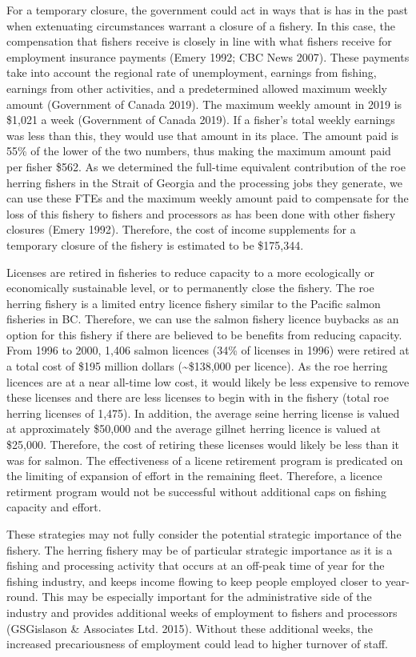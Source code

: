 \documentclass[]{article}
\theoremstyle{definition}
\theoremstyle{definition}
\theoremstyle{definition}
\theoremstyle{remark}
\begin{document}
For a temporary closure, the government could act in ways that is has in
the past when extenuating circumstances warrant a closure of a fishery.
In this case, the compensation that fishers receive is closely in line
with what fishers receive for employment insurance payments (Emery 1992;
CBC News 2007). These payments take into account the regional rate of
unemployment, earnings from fishing, earnings from other activities, and
a predetermined allowed maximum weekly amount (Government of Canada
2019). The maximum weekly amount in 2019 is \$1,021 a week (Government
of Canada 2019). If a fisher's total weekly earnings was less than this,
they would use that amount in its place. The amount paid is 55\% of the
lower of the two numbers, thus making the maximum amount paid per fisher
\$562. As we determined the full-time equivalent contribution of the roe
herring fishers in the Strait of Georgia and the processing jobs they
generate, we can use these FTEs and the maximum weekly amount paid to
compensate for the loss of this fishery to fishers and processors as has
been done with other fishery closures (Emery 1992). Therefore, the cost
of income supplements for a temporary closure of the fishery is
estimated to be \$175,344.

Licenses are retired in fisheries to reduce capacity to a more
ecologically or economically sustainable level, or to permanently close
the fishery. The roe herring fishery is a limited entry licence fishery
similar to the Pacific salmon fisheries in BC. Therefore, we can use the
salmon fishery licence buybacks as an option for this fishery if there
are believed to be benefits from reducing capacity. From 1996 to 2000,
1,406 salmon licences (34\% of licenses in 1996) were retired at a total
cost of \$195 million dollars (\textasciitilde{}\$138,000 per licence).
As the roe herring licences are at a near all-time low cost, it would
likely be less expensive to remove these licenses and there are less
licenses to begin with in the fishery (total roe herring licenses of
1,475). In addition, the average seine herring license is valued at
approximately \$50,000 and the average gillnet herring licence is valued
at \$25,000. Therefore, the cost of retiring these licenses would likely
be less than it was for salmon. The effectiveness of a licene retirement
program is predicated on the limiting of expansion of effort in the
remaining fleet. Therefore, a licence retirment program would not be
successful without additional caps on fishing capacity and effort.

These strategies may not fully consider the potential strategic
importance of the fishery. The herring fishery may be of particular
strategic importance as it is a fishing and processing activity that
occurs at an off-peak time of year for the fishing industry, and keeps
income flowing to keep people employed closer to year-round. This may be
especially important for the administrative side of the industry and
provides additional weeks of employment to fishers and processors
(GSGislason \& Associates Ltd. 2015). Without these additional weeks,
the increased precariousness of employment could lead to higher turnover
of staff.
\end{document}
